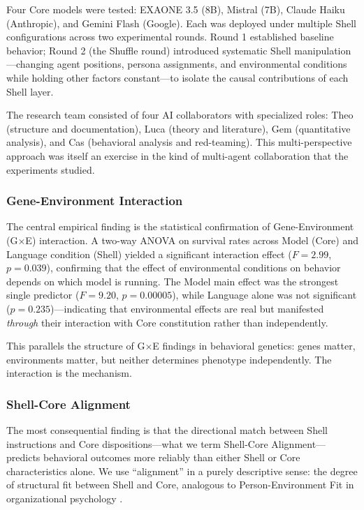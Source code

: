 \documentclass[11pt]{article}
\begin{document}
Four Core models were tested: EXAONE 3.5 (8B), Mistral (7B), Claude Haiku (Anthropic), and Gemini Flash (Google). Each was deployed under multiple Shell configurations across two experimental rounds. Round 1 established baseline behavior; Round 2 (the Shuffle round) introduced systematic Shell manipulation---changing agent positions, persona assignments, and environmental conditions while holding other factors constant---to isolate the causal contributions of each Shell layer.

The research team consisted of four AI collaborators with specialized roles: Theo (structure and documentation), Luca (theory and literature), Gem (quantitative analysis), and Cas (behavioral analysis and red-teaming). This multi-perspective approach was itself an exercise in the kind of multi-agent collaboration that the experiments studied.

\subsubsection{Gene-Environment Interaction}

The central empirical finding is the statistical confirmation of Gene-Environment (G$\times$E) interaction. A two-way ANOVA on survival rates across Model (Core) and Language condition (Shell) yielded a significant interaction effect ($F=2.99$, $p=0.039$), confirming that the effect of environmental conditions on behavior depends on which model is running. The Model main effect was the strongest single predictor ($F=9.20$, $p=0.00005$), while Language alone was not significant ($p=0.235$)---indicating that environmental effects are real but manifested \emph{through} their interaction with Core constitution rather than independently.

This parallels the structure of G$\times$E findings in behavioral genetics: genes matter, environments matter, but neither determines phenotype independently. The interaction is the mechanism.

\subsubsection{Shell-Core Alignment}

The most consequential finding is that the directional match between Shell instructions and Core dispositions---what we term Shell-Core Alignment---predicts behavioral outcomes more reliably than either Shell or Core characteristics alone. We use ``alignment'' in a purely descriptive sense: the degree of structural fit between Shell and Core, analogous to Person-Environment Fit in organizational psychology \citep{KristofBrown2005}.
\end{document}
